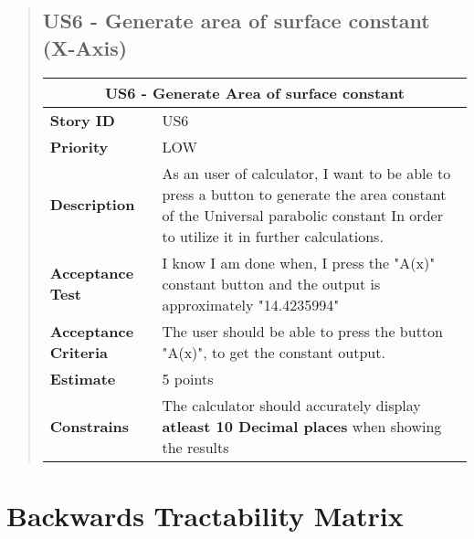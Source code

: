 \documentclass[12pt]{report}
\begin{document}
\begin{quote}
              \section{US6 - Generate area of surface constant (X-Axis)}
                \begin{tabular}{ |p{4cm}|p{10cm}| }
                 \hline
                 \multicolumn{2}{|c|}{\textbf{US6 - Generate Area of surface constant} } \\
                 \hline
                 \textbf {Story ID}& US6  \\
                 \hline
                 \textbf{Priority} & LOW \\
                 \hline
                 \textbf{Description}   & As an user of calculator, I want to be able to press a button to generate the area constant of the Universal parabolic constant In order to utilize it in further calculations. \\
                 \hline
                 \textbf{Acceptance Test}& I know I am done when, I press the "A(x)" constant button and the output is approximately "14.4235994" \\
                 \hline
                 \textbf{Acceptance Criteria}& The user should be able to press the button "A(x)", to get the constant output.\\
                 \hline
                 \textbf{Estimate} &  5 points  \\
                 \hline
                 \textbf{Constrains}&  The calculator should accurately display  \textbf{atleast 10 Decimal places} when showing the results   \\
                 \hline
                \end{tabular}

            
            
             
        
        
            
        \end{quote}
 \newpage

\chapter{Backwards Tractability Matrix}
\end{document}
